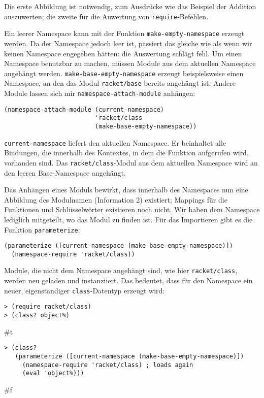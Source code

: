 Die erste Abbildung ist notwendig, zum Ausdrücke wie das Beispiel der Addition auszuwerten; die zweite für die Auwertung von \texttt{require}-Befehlen.

Ein leerer Namespace kann mit der Funktion \texttt{make-empty-namespace} erzeugt werden. Da der Namespace jedoch leer ist, passiert das gleiche wie als wenn wir keinen Namespace engegeben hätten: die Auswertung schlägt fehl. Um einen Namespace benutzbar zu machen, müssen Module aus dem aktuellen Namespace angehängt werden. \texttt{make-base-empty-namespace} erzeugt beispielsweise einen Namespace, an den das Modul \texttt{racket/base} bereits angehängt ist. Andere Module lassen sich mir \texttt{namespace-attach-module} anhängen:

\begin{lstlisting}
(namespace-attach-module (current-namespace)
                         'racket/class
                         (make-base-empty-namespace))
\end{lstlisting}

\texttt{current-namespace} liefert den aktuellen Namespace. Er beinhaltet alle Bindungen, die innerhalb des Kontextes, in dem die Funktion aufgerufen wird, vorhanden sind. Das \texttt{racket/class}-Modul aus dem aktuellen Namespace wird an den leeren Base-Namespace angehängt.

Das Anhängen eines Moduls bewirkt, dass innerhalb des Namespaces nun eine Abbildung des Modulnamen (Information 2) existiert; Mappings für die Funktionen und Schlüsselwörter existieren noch nicht. Wir haben dem Namespace lediglich mitgeteilt, wo das Modul zu finden ist. Für das Importieren gibt es die Funktion \texttt{parameterize}:

\begin{lstlisting}
(parameterize ([current-namespace (make-base-empty-namespace)])
  (namespace-require 'racket/class))
\end{lstlisting}

Module, die nicht dem Namespace angehängt sind, wie hier \texttt{racket/class}, werden neu geladen und instanziiert. Das bedeutet, dass für den Namespace ein neuer, eigenständiger \texttt{class}-Datentyp erzeugt wird:

\begin{lstlisting}
> (require racket/class)
> (class? object%)
\end{lstlisting}
{\routput \#t}

\begin{lstlisting}
> (class?
   (parameterize ([current-namespace (make-base-empty-namespace)])
     (namespace-require 'racket/class) ; loads again
     (eval 'object%)))
\end{lstlisting}
{\routput \#f}

